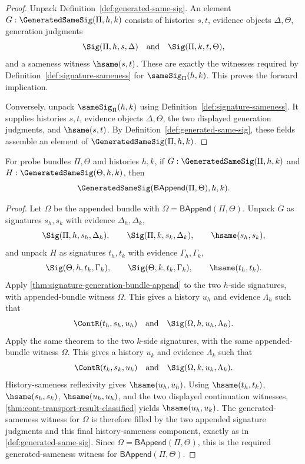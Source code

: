 \begin{proof}
Unpack Definition~\autoref{def:generated-same-sig}. An element $G:\GeneratedSameSig(\Pi,h,k)$ consists of histories $s,t$, evidence objects $\Delta,\Theta$, generation judgments
$$
\Sig(\Pi,h,s,\Delta)
\quad\text{and}\quad
\Sig(\Pi,k,t,\Theta),
$$
and a sameness witness $\hsame(s,t)$. These are exactly the witnesses required by Definition~\autoref{def:signature-sameness} for $\sameSig_\Pi(h,k)$. This proves the forward implication.

Conversely, unpack $\sameSig_\Pi(h,k)$ using Definition~\autoref{def:signature-sameness}. It supplies histories $s,t$, evidence objects $\Delta,\Theta$, the two displayed generation judgments, and $\hsame(s,t)$. By Definition~\autoref{def:generated-same-sig}, these fields assemble an element of $\GeneratedSameSig(\Pi,h,k)$.
\end{proof}

\begin{theorem}
\label{thm:generated-same-sig-bundle-append-closure}
For probe bundles $\Pi,\Theta$ and histories $h,k$, if
$G:\GeneratedSameSig(\Pi,h,k)$ and $H:\GeneratedSameSig(\Theta,h,k)$, then
$$
\GeneratedSameSig(\mathsf{BAppend}(\Pi,\Theta),h,k).
$$
\end{theorem}

\begin{proof}
Let $\Omega$ be the appended bundle with $\Omega=\mathsf{BAppend}(\Pi,\Theta)$.
Unpack $G$ as signatures $s_h,s_k$ with evidence $\Delta_h,\Delta_k$,
$$
\Sig(\Pi,h,s_h,\Delta_h),
\qquad
\Sig(\Pi,k,s_k,\Delta_k),
\qquad
\hsame(s_h,s_k),
$$
and unpack $H$ as signatures $t_h,t_k$ with evidence $\Gamma_h,\Gamma_k$,
$$
\Sig(\Theta,h,t_h,\Gamma_h),
\qquad
\Sig(\Theta,k,t_k,\Gamma_k),
\qquad
\hsame(t_h,t_k).
$$
Apply \autoref{thm:signature-generation-bundle-append} to the two $h$-side signatures, with appended-bundle witness $\Omega$. This gives a history $u_h$ and evidence $\Lambda_h$ such that
$$
\ContR(t_h,s_h,u_h)
\quad\text{and}\quad
\Sig(\Omega,h,u_h,\Lambda_h).
$$
Apply the same theorem to the two $k$-side signatures, with the same appended-bundle witness $\Omega$. This gives a history $u_k$ and evidence $\Lambda_k$ such that
$$
\ContR(t_k,s_k,u_k)
\quad\text{and}\quad
\Sig(\Omega,k,u_k,\Lambda_k).
$$
History-sameness reflexivity gives $\hsame(u_h,u_h)$. Using $\hsame(t_h,t_k)$, $\hsame(s_h,s_k)$, $\hsame(u_h,u_h)$, and the two displayed continuation witnesses, \autoref{thm:cont-transport-result-classified} yields $\hsame(u_h,u_k)$. The generated-sameness witness for $\Omega$ is therefore filled by the two appended signature judgments and this final history-sameness component, exactly as in \autoref{def:generated-same-sig}. Since $\Omega=\mathsf{BAppend}(\Pi,\Theta)$, this is the required generated-sameness witness for $\mathsf{BAppend}(\Pi,\Theta)$.
\end{proof}

